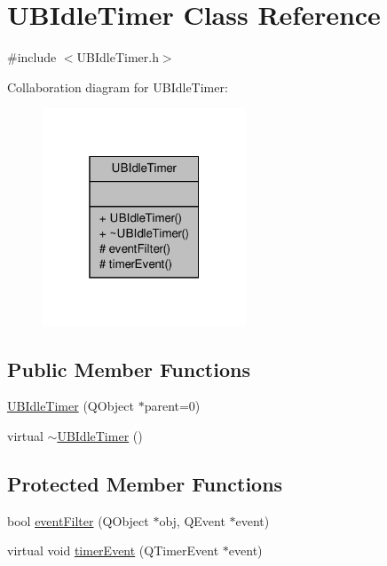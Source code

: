 \hypertarget{class_u_b_idle_timer}{\section{U\-B\-Idle\-Timer Class Reference}
\label{d4/d7f/class_u_b_idle_timer}
}


{\ttfamily \#include $<$U\-B\-Idle\-Timer.\-h$>$}



Collaboration diagram for U\-B\-Idle\-Timer\-:
\nopagebreak
\begin{figure}[H]
\begin{center}
\leavevmode
\includegraphics[width=172pt]{de/d46/class_u_b_idle_timer__coll__graph}
\end{center}
\end{figure}
\subsection*{Public Member Functions}
\begin{DoxyCompactItemize}
\item 
\hyperlink{class_u_b_idle_timer_a230f3cc88ebeb2307fb6015c2fe04c80}{U\-B\-Idle\-Timer} (Q\-Object $\ast$parent=0)
\item 
virtual \hyperlink{class_u_b_idle_timer_af90aac9c18632ca1ff1d0037f434cd8e}{$\sim$\-U\-B\-Idle\-Timer} ()
\end{DoxyCompactItemize}
\subsection*{Protected Member Functions}
\begin{DoxyCompactItemize}
\item 
bool \hyperlink{class_u_b_idle_timer_a8fc66fb14b790902da61f5081d750932}{event\-Filter} (Q\-Object $\ast$obj, Q\-Event $\ast$event)
\item 
virtual void \hyperlink{class_u_b_idle_timer_a8573efd947ea486744648085bdd72b65}{timer\-Event} (Q\-Timer\-Event $\ast$event)
\end{DoxyCompactItemize}


